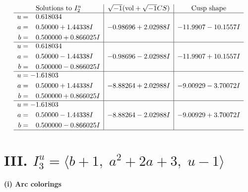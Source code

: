 \documentclass[1p]{elsarticle_modified}
\theoremstyle{definition}
\newcommand{\I}{\sqrt{-1}}
\begin{document}
$$\begin{array}{c|c|c}  
\text{Solutions to }I^u_{2}& \I (\text{vol} + \sqrt{-1}CS) & \text{Cusp shape}\\
 \hline 
\begin{aligned}
u &= \phantom{-}0.618034\phantom{ +0.000000I} \\
a &= \phantom{-}0.50000 + 1.44338 I \\
b &= \phantom{-}0.500000 + 0.866025 I\end{aligned}
 & -0.98696 + 2.02988 I & -11.9907 - 10.1557 I \\ \hline\begin{aligned}
u &= \phantom{-}0.618034\phantom{ +0.000000I} \\
a &= \phantom{-}0.50000 - 1.44338 I \\
b &= \phantom{-}0.500000 - 0.866025 I\end{aligned}
 & -0.98696 - 2.02988 I & -11.9907 + 10.1557 I \\ \hline\begin{aligned}
u &= -1.61803\phantom{ +0.000000I} \\
a &= \phantom{-}0.50000 + 1.44338 I \\
b &= \phantom{-}0.500000 + 0.866025 I\end{aligned}
 & -8.88264 + 2.02988 I & -9.00929 - 3.70072 I \\ \hline\begin{aligned}
u &= -1.61803\phantom{ +0.000000I} \\
a &= \phantom{-}0.50000 - 1.44338 I \\
b &= \phantom{-}0.500000 - 0.866025 I\end{aligned}
 & -8.88264 - 2.02988 I & -9.00929 + 3.70072 I\\
 \hline 
 \end{array}$$\newpage\newpage\renewcommand{\arraystretch}{1}
\centering \section*{III. $I^u_{3}= \langle b+1,\;a^2+2 a+3,\;u-1 \rangle$}
\flushleft \textbf{(i) Arc colorings}\\
\end{document}
